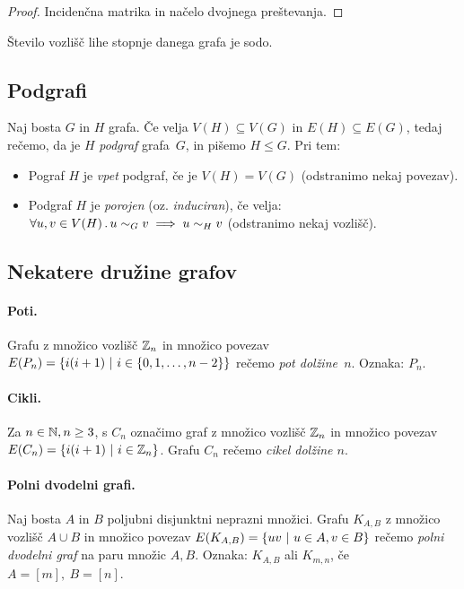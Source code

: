 \begin{proof}
    Incidenčna matrika in načelo dvojnega preštevanja.
\end{proof}

\begin{posledica}
    Število vozlišč lihe stopnje danega grafa je sodo.
\end{posledica}

\subsection{Podgrafi}
\begin{definicija}
    Naj bosta $G$ in $H$ grafa. Če velja $V(H) \subseteq V(G)$ in $E(H) \subseteq E(G)$, tedaj rečemo, da je $H$ \emph{podgraf} grafa~$G$, in pišemo $H \leq G$. Pri tem:
    \begin{itemize}
        \item Pograf $H$ je \emph{vpet} podgraf, če je $V(H) = V(G)$ (odstranimo nekaj povezav).
        \item Podgraf $H$ je \emph{porojen} (oz. \emph{induciran}), če velja:  $\forall u, v \in V(H) \,.\, u \sim_G v \implies u \sim_H v$ (odstranimo nekaj vozlišč).
    \end{itemize}
\end{definicija}

\subsection{Nekatere družine grafov}
\paragraph{Poti.} Grafu z množico vozlišč $\mathbb{Z}_n$ in množico povezav $E(P_n) = \left\{i(i+1) \ | \ i \in \left\{0,1, \ldots, n-2\right\}\right\}$ rečemo \emph{pot dolžine~$n$}. Oznaka: $P_n$.

\paragraph{Cikli.} Za $n \in \mathbb{N}, n \geq 3$, s $C_n$ označimo graf z množico vozlišč $\mathbb{Z}_n$ in množico povezav $E(C_n) = \left\{i(i+1) \ | \ i \in \mathbb{Z}_n\right\}$. Grafu $C_n$ rečemo \emph{cikel dolžine $n$}.

\paragraph{Polni dvodelni grafi.} Naj bosta $A$ in $B$ poljubni disjunktni neprazni množici. Grafu $K_{A, B}$ z množico vozlišč $A \cup B$ in množico povezav $E(K_{A,B}) = \left\{uv \ | \ u \in A, v \in B\right\}$ rečemo \emph{polni dvodelni graf} na paru množic $A, B$. Oznaka: $K_{A, B}$ ali $K_{m, n}$, če $A = [m], \ B = [n]$.

